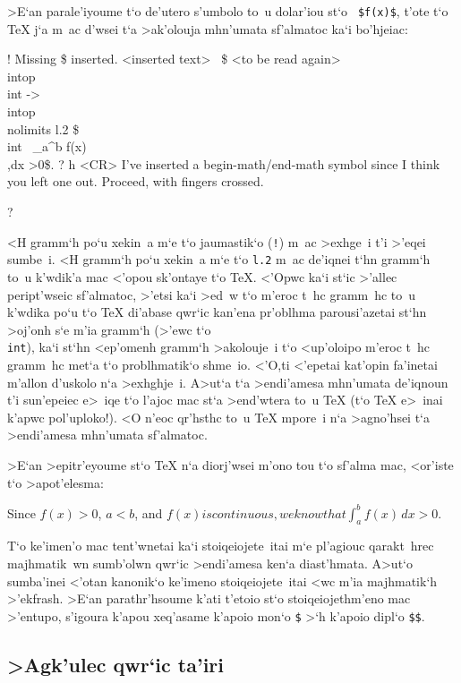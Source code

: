 >E`an parale'iyoume t`o de'utero s'umbolo to~u dolar'iou st`o {\tt
\$f(x)\$}, t'ote t`o {\rm \TeX} j`a m~ac d'wsei t`a >ak'olouja mhn'umata
sf'almatoc ka`i bo'hjeiac:

\beginuser \obeyspaces
! Missing \$ inserted.
<inserted text>
\               \$
<to be read again>
\                  \\intop
\\int ->\\intop
\             \\nolimits
l.2 \$\\int
\          \_{}a\^{}b f(x)\\,dx >0\$.
? h <CR>
I've inserted a begin-math/end-math symbol since I think
you left one out. Proceed, with fingers crossed.

?
\enduser

<H gramm`h po`u xekin~a m`e t`o jaumastik`o ({\tt !}\null) m~ac >exhge~i
t'i >'eqei sumbe~i.  <H gramm`h po`u xekin~a m`e t`o {\tt l.2} m~ac
de'iqnei t`hn gramm`h to~u k'wdik'a mac <'opou sk'ontaye t`o
{\rm\TeX}\null.  <'Opwc ka`i st`ic >'allec peript'wseic sf'almatoc,
>'etsi ka`i >ed~w t`o m'eroc t~hc gramm~hc to~u k'wdika po`u t`o {\rm
\TeX} di'abase qwr`ic kan'ena pr'oblhma parousi'azetai st`hn >oj'onh s`e
m'ia gramm`h (>'ewc t`o {\tt \\int}), ka`i st`hn <ep'omenh gramm`h
>akolouje~i t`o <up'oloipo m'eroc t~hc gramm~hc met`a t`o problhmatik`o
shme~io.  <'O,ti <'epetai kat'opin fa'inetai m'allon d'uskolo n`a
>exhghje~i.  A>ut`a t`a >endi'amesa mhn'umata de'iqnoun t'i sun'epeiec
e>~iqe t`o l'ajoc mac st`a >end'wtera to~u {\rm \TeX} (t`o {\rm \TeX}
e>~inai k'apwc pol'uploko!). <O n'eoc qr'hsthc to~u {\rm \TeX} mpore~i
n`a >agno'hsei t`a >endi'amesa mhn'umata sf'almatoc. 

>E`an >epitr'eyoume st`o {\rm \TeX} n`a diorj'wsei m'ono tou t`o
sf'alma mac, <or'iste t`o >apot'elesma:

{ \rm
Since $f(x) > 0$, $a<b$,  and $f(x) is continuous, we know that
\int_a^b f(x)\,dx >0$.
} %

T`o ke'imen'o mac tent'wnetai ka`i stoiqeiojete~itai m`e pl'agiouc
qarakt~hrec majhmatik~wn sumb'olwn qwr`ic >endi'amesa ken`a diast'hmata.
A>ut`o sumba'inei <'otan kanonik`o ke'imeno stoiqeiojete~itai <wc m'ia
majhmatik`h >'ekfrash. >E`an parathr'hsoume k'ati t'etoio st`o
stoiqeiojethm'eno mac >'entupo, s'igoura k'apou xeq'asame k'apoio mon`o
{\tt \$} >`h k'apoio dipl`o {\tt \$\$}.

\subsection{>Agk'ulec qwr`ic ta'iri}

